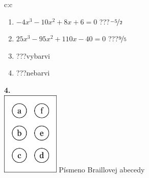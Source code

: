 \documentclass[10pt]{report}
\begin{document}
\begin{tabular}{c:c}
\begin{minipage}[c][99mm][t]{0.49\linewidth}
\begin{center}
\begin{minipage}{0.77\linewidth}
\begin{center}
\begin{varwidth}{\textwidth}
\begin{enumerate}
\item $-4x^3-10x^2+8x+6=0$\quad \dotfill\; ???\;\dotfill \quad $\nicefrac{-5}{2}$
\item $25x^3-95x^2+110x-40=0$\quad \dotfill\; ???\;\dotfill \quad $\nicefrac{9}{5}$
\item \quad \dotfill\; ???\;\dotfill \quad vybarvi
\item \quad \dotfill\; ???\;\dotfill \quad nebarvi
\end{enumerate}
\end{varwidth}
\end{center}
\end{minipage}
\begin{minipage}{0.20\linewidth}
\begin{center}
{\Huge\bfseries 4.} \\[2mm]
\includegraphics[height=40mm]{../images/braille.png}
{\small Písmeno Braillovej abecedy}
\end{center}
\end{minipage}
\end{center}
\end{minipage}

\end{tabular}
\clearpage
\thispagestyle{empty}
\end{document}
